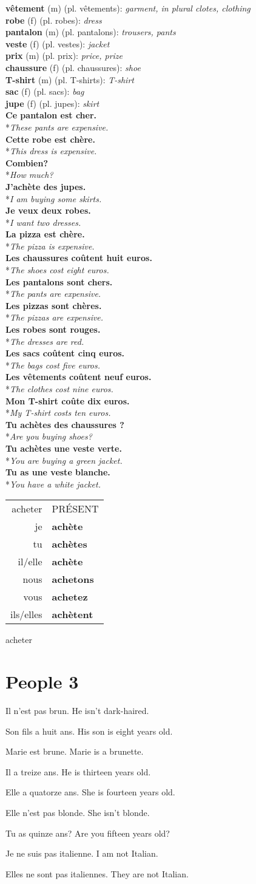 \documentclass[a4paper,11pt,oneside]{book}
\newcommand{\phrase}[2]{\noindent\textbf{#1}\\*\-\hspace{0.5cm}\textit{#2}\\}
\newcommand{\verbconj}[8]{
    \begin{tabular}{rl}
    #1 & \MakeUppercase{#2} \\ 
    je & \textbf{#3} \\  
    tu & \textbf{#4} \\
    il/elle & \textbf{#5} \\  
    nous & \textbf{#6} \\  
    vous & \textbf{#7} \\  
    ils/elles & \textbf{#8}  
    \end{tabular}
}
\newcommand{\noundef}[4]{\textbf{#1} (#3) (pl. #2): \textit{#4}\\}
\begin{document}
\noundef{vêtement}{vêtements}{m}{garment, in plural clotes, clothing}
\noundef{robe}{robes}{f}{dress}
\noundef{pantalon}{pantalons}{m}{trousers, pants}
\noundef{veste}{vestes}{f}{jacket}
\noundef{prix}{prix}{m}{price, prize}
\noundef{chaussure}{chaussures}{f}{shoe}
\noundef{T-shirt}{T-shirts}{m}{T-shirt}
\noundef{sac}{sacs}{f}{bag}
\noundef{jupe}{jupes}{f}{skirt}

\phrase{Ce pantalon est cher.}{These pants are expensive.}
\phrase{Cette robe est chère.}{This dress is expensive.}
\phrase{Combien?}{How much?}
\phrase{J'achète des jupes.}{I am buying some skirts.}
\phrase{Je veux deux robes.}{I want two dresses.}
\phrase{La pizza est chère.}{The pizza is expensive.}
\phrase{Les chaussures coûtent huit euros.}{The shoes cost eight euros.}
\phrase{Les pantalons sont chers.}{The pants are expensive.}
\phrase{Les pizzas sont chères.}{The pizzas are expensive.}
\phrase{Les robes sont rouges.}{The dresses are red.}
\phrase{Les sacs coûtent cinq euros.}{The bags cost five euros.}
\phrase{Les vêtements coûtent neuf euros.}{The clothes cost nine euros.}
\phrase{Mon T-shirt coûte dix euros.}{My T-shirt costs ten euros.}
\phrase{Tu achètes des chaussures ?}{Are you buying shoes?}
\phrase{Tu achètes une veste verte.}{You are buying a green jacket.}
\phrase{Tu as une veste blanche.}{You have a white jacket.}

\begin{center}
    \verbconj{acheter}{Présent}{achète}{achètes}{achète}{achetons}{achetez}{achètent}{acheter}
\end{center}

\section{People 3}

Il n'est pas brun.
He isn't dark-haired.

Son fils a huit ans.
His son is eight years old.

Marie est brune.
Marie is a brunette.

Il a treize ans.
He is thirteen years old.

Elle a quatorze ans.
She is fourteen years old.

Elle n'est pas blonde.
She isn't blonde.

Tu as quinze ans?
Are you fifteen years old?

Je ne suis pas italienne.
I am not Italian.

Elles ne sont pas italiennes.
They are not Italian.
\end{document}
